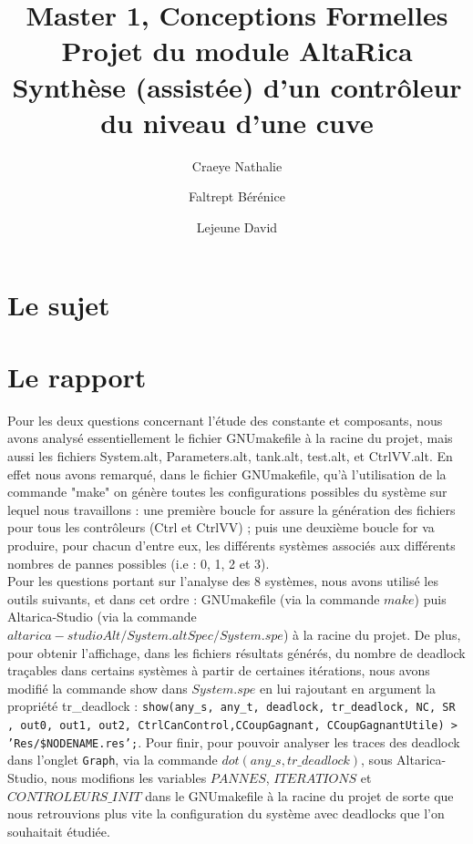 \documentclass[a4paper]{book}
\newcommand{\altarica}{{\sc AltaRica}}
\begin{document}
\title{Master 1, Conceptions Formelles\\
Projet du module \altarica\\
Synthèse (assistée) d'un contrôleur du niveau d'une cuve}

\date{}

\author{Craeye Nathalie \and Faltrept Bérénice \and Lejeune David}

\maketitle

\chapter{Le sujet}


\chapter{Le rapport}

Pour les deux questions concernant l'étude des constante et composants, nous avons analysé essentiellement le fichier GNUmakefile à la racine du projet, mais aussi les fichiers System.alt, Parameters.alt, tank.alt, test.alt, et CtrlVV.alt.
En effet nous avons remarqué, dans le fichier GNUmakefile, qu'à l'utilisation de la commande "make" on génère toutes les configurations possibles du système sur lequel nous travaillons : 
une première boucle for assure la génération des fichiers pour tous les contrôleurs (Ctrl et CtrlVV) ; puis une deuxième boucle for va produire, pour chacun d'entre eux, les différents systèmes associés aux différents nombres de pannes possibles (i.e : 0, 1, 2 et 3). \\

Pour les questions portant sur l'analyse des 8 systèmes, nous avons utilisé les outils suivants, et dans cet ordre : GNUmakefile (via la commande $make$) puis Altarica-Studio (via la commande $altarica-studio Alt/System.alt Spec/System.spe$) à la racine du projet. De plus, pour obtenir l'affichage, dans les fichiers résultats générés, du nombre de deadlock traçables dans certains systèmes à partir de certaines itérations, nous avons modifié la commande show dans $System.spe$ en lui rajoutant en argument la propriété tr\_deadlock :  {\tt show(any\_s, any\_t, deadlock, tr\_deadlock, NC, SR , out0, out1, out2, CtrlCanControl,CCoupGagnant, CCoupGagnantUtile) > 'Res/\$NODENAME.res';}. Pour finir, pour pouvoir analyser les traces des deadlock dans l'onglet {\tt Graph}, via la commande $dot(any\_s, tr\_deadlock)$, sous Altarica-Studio, nous modifions les variables $PANNES$, $ITERATIONS$ et $CONTROLEURS\_INIT$ dans le GNUmakefile à la racine du projet de sorte que nous retrouvions plus vite la configuration du système avec deadlocks que l'on souhaitait étudiée.
\end{document}
